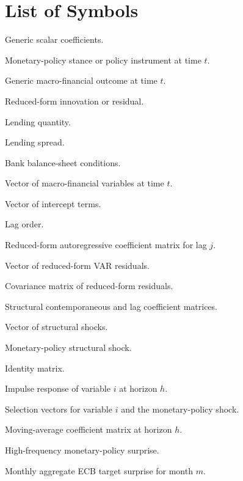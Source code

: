 \chapter*{List of Symbols}

\begin{description}[leftmargin=4.4cm,style=nextline]
  \item[\(\alpha,\beta,\gamma\)] Generic scalar coefficients.
  \item[\(i_t\)] Monetary-policy stance or policy instrument at time \(t\).
  \item[\(x_t\)] Generic macro-financial outcome at time \(t\).
  \item[\(u_t\)] Reduced-form innovation or residual.
  \item[\(\ell_t\)] Lending quantity.
  \item[\(s_t\)] Lending spread.
  \item[\(b_t\)] Bank balance-sheet conditions.
  \item[\(\vect{y}_t\)] Vector of macro-financial variables at time \(t\).
  \item[\(\vect{c}\)] Vector of intercept terms.
  \item[\(p\)] Lag order.
  \item[\(\mat{A}_j\)] Reduced-form autoregressive coefficient matrix for lag \(j\).
  \item[\(\vect{u}_t\)] Vector of reduced-form VAR residuals.
  \item[\(\mat{\Sigma}_u\)] Covariance matrix of reduced-form residuals.
  \item[\(\mat{B}_0,\mat{B}_j\)] Structural contemporaneous and lag coefficient matrices.
  \item[\(\vect{\shock}_t\)] Vector of structural shocks.
  \item[\(\policyshock_t\)] Monetary-policy structural shock.
  \item[\(\mat{I}\)] Identity matrix.
  \item[\(\IRF_i(h)\)] Impulse response of variable \(i\) at horizon \(h\).
  \item[\(\vect{e}_i,\vect{e}_{mp}\)] Selection vectors for variable \(i\) and the monetary-policy shock.
  \item[\(\mat{\Phi}_h\)] Moving-average coefficient matrix at horizon \(h\).
  \item[\(\surprise_t\)] High-frequency monetary-policy surprise.
  \item[\(\surprise_m^{target}\)] Monthly aggregate ECB target surprise for month \(m\).

\end{description}
